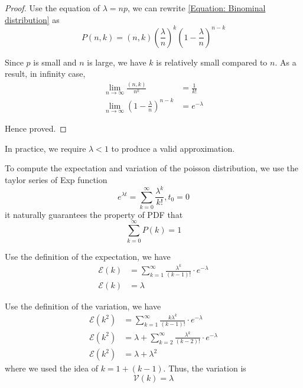 \begin{proof}
    Use the equation of $\lambda = np$, we can rewrite \eqref{Equation: Binominal distribution} as
    \begin{equation*}
        P(n, k) = (n, k) (\frac{\lambda}{n})^k (1-\frac{\lambda}{n})^{n-k}
    \end{equation*}

    Since $p$ is small and $n$ is large, we have $k$ is relatively small compared to $n$.
    As a result, in infinity case,
    \begin{align*}
        \lim_{n \rightarrow \infty} \frac{(n, k)}{n^k}          & = \frac{1}{k!}   \\
        \lim_{n \rightarrow \infty} (1-\frac{\lambda}{n})^{n-k} & = e ^ {-\lambda}
    \end{align*}

    Hence proved.
\end{proof}

In practice, we require $\lambda < 1$ to produce a valid approximation.

To compute the expectation and variation of the poisson distribution, we use the taylor series of Exp function
\begin{equation*}
    e^{\lambda t} = \sum_{k=0}^{\infty} \frac{\lambda^k}{k!}, t_0 = 0
\end{equation*}
it naturally guarantees the property of PDF that
\begin{equation*}
    \sum_{k=0}^{\infty} P(k) = 1
\end{equation*}

Use the definition of the expectation, we have
\begin{align*}
    \mathcal{E} (k) & = \sum_{k=1}^{\infty} \frac{\lambda^k}{(k-1)!} \cdot e^{-\lambda} \\
    \mathcal{E} (k) & = \lambda
\end{align*}

Use the definition of the variation, we have
\begin{align*}
    \mathcal{E} (k^2) & = \sum_{k=1}^{\infty} \frac{k \lambda^k}{(k-1)!} \cdot e^{-\lambda}         \\
    \mathcal{E} (k^2) & = \lambda + \sum_{k=2}^{\infty} \frac{\lambda^k}{(k-2)!} \cdot e^{-\lambda} \\
    \mathcal{E} (k^2) & = \lambda + \lambda^2
\end{align*}
where we used the idea of $k = 1 + (k-1)$.
Thus, the variation is
\begin{equation*}
    \mathcal{V} (k) = \lambda
\end{equation*}

